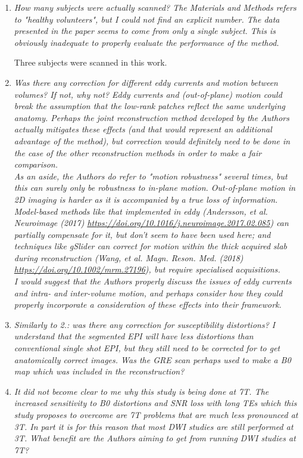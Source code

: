 \documentclass[a4paper,11pt,twoside]{report}
\begin{document}
\begin{enumerate}
    \item \textit{How many subjects were actually scanned? The Materials and Methods refers to "healthy volunteers", but I could not find an explicit number. The data presented in the paper seems to come from only a single subject. This is obviously inadequate to properly evaluate the performance of the method.}

    \hspace{1em} Three subjects were scanned in this work.

    \item \textit{Was there any correction for different eddy currents and motion between volumes? If not, why not? Eddy currents and (out-of-plane) motion could break the assumption that the low-rank patches reflect the same underlying anatomy. Perhaps the joint reconstruction method developed by the Authors actually mitigates these effects (and that would represent an additional advantage of the method), but correction would definitely need to be done in the case of the other reconstruction methods in order to make a fair comparison.\\
    As an aside, the Authors do refer to "motion robustness" several times, but this can surely only be robustness to in-plane motion. Out-of-plane motion in 2D imaging is harder as it is accompanied by a true loss of information. Model-based methods like that implemented in eddy (Andersson, et al. Neuroimage (2017) \url{https://doi.org/10.1016/j.neuroimage.2017.02.085}) can partially compensate for it, but don't seem to have been used here; and techniques like gSlider can correct for motion within the thick acquired slab during reconstruction (Wang, et al. Magn. Reson. Med. (2018) \url{https://doi.org/10.1002/mrm.27196}), but require specialised acquisitions.\\
    I would suggest that the Authors properly discuss the issues of eddy currents and intra- and inter-volume motion, and perhaps consider how they could properly incorporate a consideration of these effects into their framework.}
    \item \textit{Similarly to 2.: was there any correction for susceptibility distortions? I understand that the segmented EPI will have less distortions than conventional single shot EPI, but they still need to be corrected for to get anatomically correct images. Was the GRE scan perhaps used to make a B0 map which was included in the reconstruction?}
    \item \textit{It did not become clear to me why this study is being done at 7T. The increased sensitivity to B0 distortions and SNR loss with long TEs which this study proposes to overcome are 7T problems that are much less pronounced at 3T. In part it is for this reason that most DWI studies are still performed at 3T. What benefit are the Authors aiming to get from running DWI studies at 7T?}

\end{enumerate}
\end{document}
